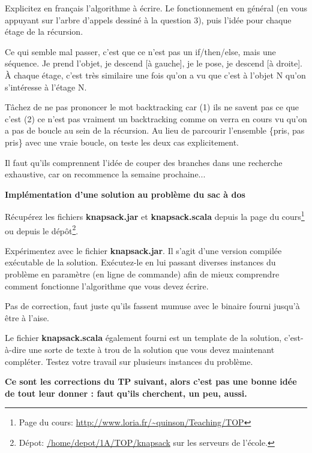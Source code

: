 \documentclass[10pt]{article}\usepackage[correction,nu]{esial}
\begin{document}
\Question Explicitez en français l'algorithme à écrire. Le fonctionnement en
général (en vous appuyant sur l'arbre d'appels dessiné à la question 3), puis
l'idée pour chaque étage de la récursion.

\begin{Reponse}
  Ce qui semble mal passer, c'est que ce n'est pas un if/then/else, mais une
  séquence. Je prend l'objet, je descend [à gauche], je le pose, je descend [à
  droite]. À chaque étage, c'est très similaire une fois qu'on a vu que c'est
  à  l'objet N qu'on s'intéresse à l'étage N.

  Tâchez de ne pas prononcer le mot backtracking car (1) ils ne savent pas ce
  que c'est (2) ce n'est pas vraiment un backtracking comme on verra en cours vu
  qu'on a pas de boucle au sein de la récursion. Au lieu de parcourir l'ensemble
  \{pris, pas pris\} avec une vraie boucle, on teste les deux cas explicitement.

  Il faut qu'ils comprennent l'idée de couper des branches dans une recherche
  exhaustive, car on recommence la semaine prochaine...
\end{Reponse}

\Exercice\textbf{Implémentation d'une solution au problème du sac à dos}

Récupérez les fichiers \textbf{knapsack.jar} et \textbf{knapsack.scala} depuis
la page du cours\footnote{Page du cours:
  \url{http://www.loria.fr/~quinson/Teaching/TOP}} ou depuis le
dépôt\footnote{Dépot: \url{/home/depot/1A/TOP/knapsack} sur les serveurs de
  l'école.}.

\Question Expérimentez avec le fichier \textbf{knapsack.jar}. Il s'agit d'une
version compilée exécutable de la solution. Exécutez-le en lui passant diverses
instances du problème en paramètre (en ligne de commande) afin de mieux
comprendre comment fonctionne l'algorithme que vous devez écrire.

\begin{Reponse}
  Pas de correction, faut juste qu'ils fassent mumuse avec le binaire fourni
  jusqu'à être à l'aise.
\end{Reponse}

\Question Le fichier \textbf{knapsack.scala} également fourni est un template de
la solution, c'est-à-dire une sorte de texte à trou de la solution que vous
devez maintenant compléter. Testez votre travail sur plusieurs instances du problème.

\begin{Reponse}
  \noindent\textbf{Ce sont les corrections du TP suivant, alors c'est pas une
    bonne idée de tout leur donner : faut qu'ils cherchent, un peu,
    aussi.}
    
\end{Reponse}
\end{document}
